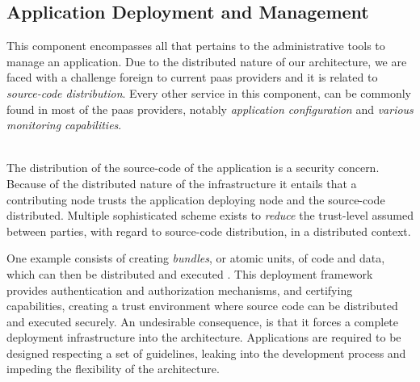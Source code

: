 \documentclass[12pt, titlepage]{uo_temp}
\begin{document}
     \subsection{Application Deployment and Management}
     This component encompasses all that pertains to the administrative tools to manage an
     application. Due to the distributed nature of our architecture, we are faced with a
     challenge foreign to current \gls{paas} providers and it is related to
     \emph{source-code distribution}. Every other service in this component, can be
     commonly found in most of the \gls{paas} providers, notably \emph{application
       configuration} and \emph{various monitoring capabilities}.

     \\ The distribution of the source-code of the application is a security concern.
     Because of the distributed nature of the infrastructure it entails that a
     contributing node trusts the application deploying node and the source-code
     distributed. Multiple sophisticated scheme exists to \emph{reduce} the trust-level
     assumed between parties, with regard to source-code distribution, in a distributed
     context.

     One example consists of creating \emph{bundles}, or atomic units, of code and data,
     which can then be distributed and executed \cite{dearle2004flexible}. This deployment
     framework provides authentication and authorization mechanisms, and certifying
     capabilities, creating a trust environment where source code can be distributed and
     executed securely. An undesirable consequence, is that it forces a complete
     deployment infrastructure into the architecture. Applications are required to be
     designed respecting a set of guidelines, leaking into the development process and
     impeding the flexibility of the architecture.
\end{document}
